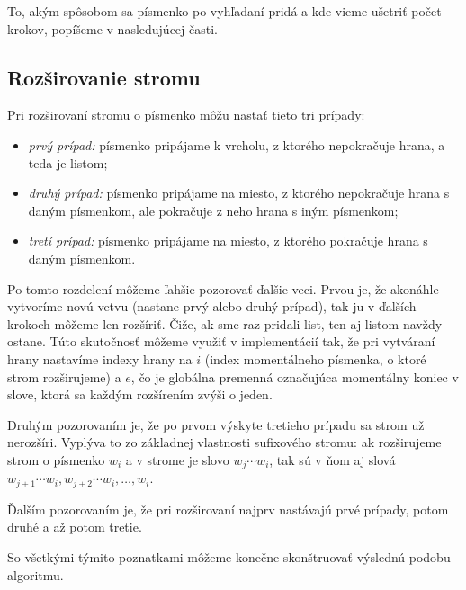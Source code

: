 To, akým spôsobom sa písmenko po vyhľadaní pridá a kde vieme ušetriť počet 
krokov, popíšeme v nasledujúcej časti.

\subsection{Rozširovanie stromu}

Pri rozširovaní stromu o písmenko môžu nastať tieto tri prípady:
\begin{itemize}
\item \emph{prvý prípad:} písmenko pripájame k vrcholu, z ktorého nepokračuje 
hrana, a teda je listom;
\item \emph{druhý prípad:} písmenko pripájame na miesto, z ktorého nepokračuje 
hrana s daným písmenkom, ale pokračuje z neho hrana s iným písmenkom;
\item \emph{tretí prípad:} písmenko pripájame na miesto, z ktorého pokračuje 
hrana s daným písmenkom.
\end{itemize}

Po tomto rozdelení môžeme ľahšie pozorovať ďalšie veci. Prvou je, že akonáhle 
vytvoríme novú vetvu (nastane prvý alebo druhý prípad), tak ju v ďalších 
krokoch môžeme len rozšíriť. Čiže, ak sme raz pridali list, ten aj listom 
navždy ostane. Túto skutočnosť môžeme využiť v implementácií tak, že pri 
vytváraní hrany 
nastavíme indexy hrany na $i$ (index momentálneho písmenka, o ktoré strom 
rozširujeme) a $e$, čo je globálna premenná označujúca momentálny koniec v 
slove, ktorá sa každým rozšírením zvýši o jeden.

Druhým pozorovaním je, že po prvom výskyte tretieho prípadu sa strom už 
nerozšíri. Vyplýva to zo základnej vlastnosti sufixového stromu: ak 
rozširujeme strom o písmenko $w_i$ a v strome je slovo $w_j\cdots w_i$, tak 
sú v ňom aj slová $w_{j+1}\cdots w_i, w_{j+2}\cdots w_i,\ldots, w_i$.

Ďalším pozorovaním je, že pri rozširovaní najprv nastávajú prvé prípady, 
potom druhé a až potom tretie.

So všetkými týmito poznatkami môžeme konečne skonštruovať výslednú podobu 
algoritmu.

